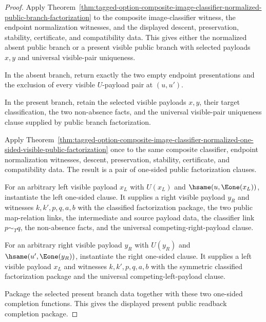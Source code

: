 \begin{proof}
Apply
Theorem~\ref{thm:tagged-option-composite-image-classifier-normalized-public-branch-factorization}
to the composite image-classifier witness, the endpoint normalization witnesses,
and the displayed descent, preservation, stability, certificate, and
compatibility data. This gives either the normalized absent public branch or a
present visible public branch with selected payloads $x,y$ and universal
visible-pair uniqueness.

In the absent branch, return exactly the two empty endpoint presentations and
the exclusion of every visible $U$-payload pair at $(u,u')$.

In the present branch, retain the selected visible payloads $x,y$, their target
classification, the two non-absence facts, and the universal visible-pair
uniqueness clause supplied by public branch factorization.

Apply
Theorem~\ref{thm:tagged-option-composite-image-classifier-normalized-one-sided-visible-public-factorization}
once to the same composite classifier, endpoint normalization witnesses,
descent, preservation, stability, certificate, and compatibility data. The
result is a pair of one-sided public factorization clauses.

For an arbitrary left visible payload $x_L$ with $U(x_L)$ and
$\hsame(u,\Eone(x_L))$, instantiate the left one-sided clause. It supplies a
right visible payload $y_R$ and witnesses $k,k',p,q,a,b$ with the classified
factorization package, the two public map-relation links, the intermediate and
source payload data, the classifier link $p\sim_T q$, the non-absence facts, and
the universal competing-right-payload clause.

For an arbitrary right visible payload $y_R$ with $U(y_R)$ and
$\hsame(u',\Eone(y_R))$, instantiate the right one-sided clause. It supplies a
left visible payload $x_L$ and witnesses $k,k',p,q,a,b$ with the symmetric
classified factorization package and the universal competing-left-payload
clause.

Package the selected present branch data together with these two one-sided
completion functions. This gives the displayed present public readback
completion package.
\end{proof}

